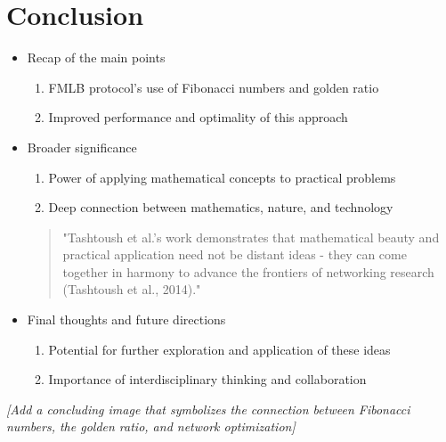\documentclass{article}
\begin{document}
\section{Conclusion}
\begin{itemize}
    \item Recap of the main points
    \begin{enumerate}
        \item FMLB protocol's use of Fibonacci numbers and golden ratio
        \item Improved performance and optimality of this approach
    \end{enumerate}
    \item Broader significance
    \begin{enumerate}
        \item Power of applying mathematical concepts to practical problems
        \item Deep connection between mathematics, nature, and technology
    \end{enumerate}
    \begin{quote}
        "Tashtoush et al.'s work demonstrates that mathematical beauty and practical application need not be distant ideas - they can come together in harmony to advance the frontiers of networking research (Tashtoush et al., 2014)."
    \end{quote}
    \item Final thoughts and future directions
    \begin{enumerate}
        \item Potential for further exploration and application of these ideas
        \item Importance of interdisciplinary thinking and collaboration
    \end{enumerate}
\end{itemize}
\textit{[Add a concluding image that symbolizes the connection between Fibonacci numbers, the golden ratio, and network optimization]}
\end{document}
